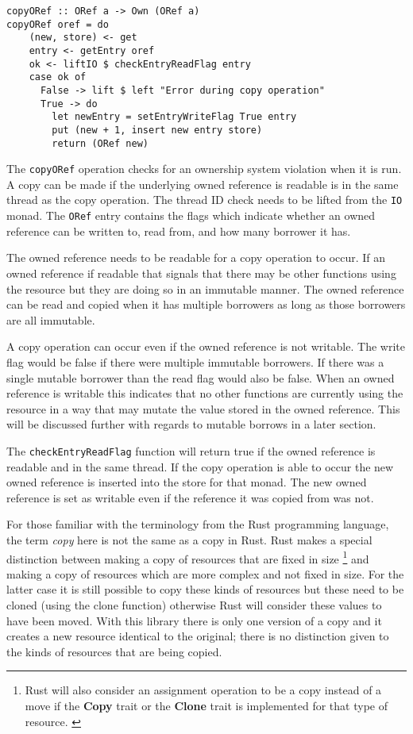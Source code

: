 \documentclass[onehalf,11pt]{beavtex}
\begin{document}
\begin{verbatim}
copyORef :: ORef a -> Own (ORef a)
copyORef oref = do
    (new, store) <- get
    entry <- getEntry oref
    ok <- liftIO $ checkEntryReadFlag entry
    case ok of
      False -> lift $ left "Error during copy operation"
      True -> do
        let newEntry = setEntryWriteFlag True entry
        put (new + 1, insert new entry store)
        return (ORef new)
\end{verbatim}

The \texttt{copyORef} operation checks for an ownership system violation when
it is run.  A copy can be made if the underlying owned reference is readable
is in the same thread as the copy operation.
The thread ID check needs to be lifted from the \texttt{IO} monad.
The \texttt{ORef} entry contains the flags which indicate whether an owned
reference can be written to, read from, and how many borrower it has.

The owned reference needs to be readable for a copy operation to occur.
If an owned reference if readable that signals that there may be other functions
using the resource but they are doing so in an immutable manner. The owned
reference can be read and copied when it has multiple borrowers as long as
those borrowers are all immutable.

A copy operation can occur even if the owned reference is not writable.
The write flag would be false if there were multiple immutable borrowers. If
there was a single mutable borrower than the read flag would also be false.
When an owned reference is writable this indicates that no other functions
are currently using the resource in a way that may mutate the value stored
in the owned reference.
This will be discussed further with regards to mutable borrows in a later
section.

The \texttt{checkEntryReadFlag} function will return true if the owned reference is
readable and in the same thread.
If the copy operation is able to occur the new owned reference is inserted into
the store for that monad. The new owned reference is set as writable even if
the reference it was copied from was not. %

For those familiar with the terminology from the Rust programming language, the
term \textit{copy} here is not the same as a copy in Rust. Rust makes a special
distinction between making a copy of resources that are fixed in size
\footnote{Rust will also consider an assignment operation to be a copy instead
  of a move if the \textbf{Copy} trait or the \textbf{Clone} trait is
  implemented for that type of resource. \cite{rust_book_traits}
  \cite{rust_docs_clone_trait}}
and making a copy of resources which are more complex and not fixed in size.
For the latter case it is still possible to copy these kinds of resources but these
need to be cloned (using the clone function) otherwise Rust will consider these
values to have been moved. \cite{rust_book_ownership}
With this library there is only one version of a copy and it creates a new
resource identical to the original; there is no distinction given to the kinds
of resources that are being copied.
\end{document}
